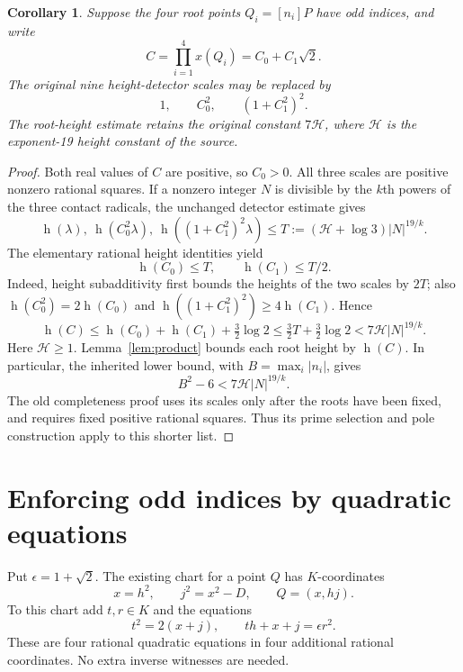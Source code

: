 \documentclass[11pt]{article}
\newtheorem{corollary}[theorem]{Corollary}
\newcommand{\HH}{\mathcal H}
\newcommand{\htw}{\operatorname h}
\begin{document}
\begin{corollary}\label{cor:scales}
Suppose the four root points $Q_i=[n_i]P$ have odd indices, and write
\[
 C=\prod_{i=1}^4x(Q_i)=C_0+C_1\sqrt2.
\]
The original nine height-detector scales may be replaced by
\[
 1,\qquad C_0^2,\qquad (1+C_1^2)^2.
\]
The root-height estimate retains the original constant $7\HH$, where $\HH$ is the exponent-19 height constant of the source.
\end{corollary}
\begin{proof}
Both real values of $C$ are positive, so $C_0>0$. All three scales are positive nonzero rational squares. If a nonzero integer $N$ is divisible by the $k$th powers of the three contact radicals, the unchanged detector estimate gives
\[
 \htw(\lambda),\ \htw(C_0^2\lambda),\
 \htw((1+C_1^2)^2\lambda)
 \le T:=(\HH+\log3)|N|^{19/k}.
\]
The elementary rational height identities yield
\[
 \htw(C_0)\le T,\qquad \htw(C_1)\le T/2.
\]
Indeed, height subadditivity first bounds the heights of the two scales by $2T$; also $\htw(C_0^2)=2\htw(C_0)$ and $\htw((1+C_1^2)^2)\ge4\htw(C_1)$. Hence
\[
 \htw(C)\le\htw(C_0)+\htw(C_1)+\tfrac32\log2
 \le\tfrac32T+\tfrac32\log2
 <7\HH |N|^{19/k}.
\]
Here $\HH\ge1$. Lemma~\ref{lem:product} bounds each root height by $\htw(C)$. In particular, the inherited lower bound, with $B=\max_i|n_i|$, gives
\begin{equation}\label{eq:height-transfer}
 B^2-6<7\HH |N|^{19/k}.
\end{equation}
The old completeness proof uses its scales only after the roots have been fixed, and requires fixed positive rational squares. Thus its prime selection and pole construction apply to this shorter list.
\end{proof}

\section{Enforcing odd indices by quadratic equations}\label{sec:chart}
Put $\epsilon=1+\sqrt2$. The existing chart for a point $Q$ has $K$-coordinates
\[
 x=h^2,\qquad j^2=x^2-D,\qquad Q=(x,hj).
\]
To this chart add $t,r\in K$ and the equations
\begin{equation}\label{eq:odd-chart}
 t^2=2(x+j),\qquad th+x+j=\epsilon r^2.
\end{equation}
These are four rational quadratic equations in four additional rational coordinates. No extra inverse witnesses are needed.
\end{document}
